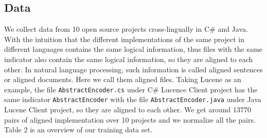 \subsection{Data}
We collect data from 10 open source projects cross-lingually in C\# and Java. With the intuition that the different implementations of the same project in different languages contains the same logical information, thus files with the same indicator also contain the same logical information, so they are aligned to each other. In natural language processing, such information is called aligned sentences or aligned documents. Here we call them aligned files. Taking Lucene as an example, the file \texttt{AbstractEncoder.cs} under C\# Lucence Client project has the same indicator \texttt{AbstractEncoder} with the file \texttt{AbstractEncoder.java} under Java Lucene Client project, so they are aligned to each other. We get around 13770 pairs of aligned implementation over 10 projects and we normalize all the pairs. Table 2 is an overview of our training data set.

